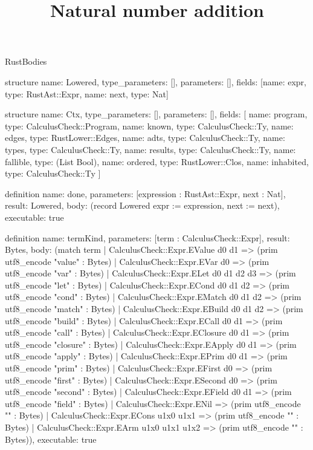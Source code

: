 \begin{lexlean}{RustBodies}
\title{Natural number addition}
\begin{semanticmodule}
structure{
  name: Lowered,
  type_parameters: [],
  parameters: [],
  fields: [{name: expr, type: RustAst::Expr}, {name: next, type: Nat}]
}

structure{
  name: Ctx,
  type_parameters: [],
  parameters: [],
  fields: [
    {name: program, type: CalculusCheck::Program},
    {name: known, type: CalculusCheck::Ty},
    {name: edges, type: RustLower::Edges},
    {name: adts, type: CalculusCheck::Ty},
    {name: types, type: CalculusCheck::Ty},
    {name: results, type: CalculusCheck::Ty},
    {name: fallible, type: (List Bool)},
    {name: ordered, type: RustLower::Clos},
    {name: inhabited, type: CalculusCheck::Ty}
  ]
}

definition{
  name: done,
  parameters: [expression : RustAst::Expr, next : Nat],
  result: Lowered,
  body: (record Lowered {expr := expression, next := next}),
  executable: true
}

definition{
  name: termKind,
  parameters: [term : CalculusCheck::Expr],
  result: Bytes,
  body: (match term
    | CalculusCheck::Expr.EValue d0 d1 => (prim utf8_encode "value" : Bytes)
    | CalculusCheck::Expr.EVar d0 => (prim utf8_encode "var" : Bytes)
    | CalculusCheck::Expr.ELet d0 d1 d2 d3 => (prim utf8_encode "let" : Bytes)
    | CalculusCheck::Expr.ECond d0 d1 d2 => (prim utf8_encode "cond" : Bytes)
    | CalculusCheck::Expr.EMatch d0 d1 d2 => (prim utf8_encode "match" : Bytes)
    | CalculusCheck::Expr.EBuild d0 d1 d2 => (prim utf8_encode "build" : Bytes)
    | CalculusCheck::Expr.ECall d0 d1 => (prim utf8_encode "call" : Bytes)
    | CalculusCheck::Expr.EClosure d0 d1 => (prim utf8_encode "closure" : Bytes)
    | CalculusCheck::Expr.EApply d0 d1 => (prim utf8_encode "apply" : Bytes)
    | CalculusCheck::Expr.EPrim d0 d1 => (prim utf8_encode "prim" : Bytes)
    | CalculusCheck::Expr.EFirst d0 => (prim utf8_encode "first" : Bytes)
    | CalculusCheck::Expr.ESecond d0 => (prim utf8_encode "second" : Bytes)
    | CalculusCheck::Expr.EField d0 d1 => (prim utf8_encode "field" : Bytes)
    | CalculusCheck::Expr.ENil => (prim utf8_encode "" : Bytes)
    | CalculusCheck::Expr.ECons u1x0 u1x1 => (prim utf8_encode "" : Bytes)
    | CalculusCheck::Expr.EArm u1x0 u1x1 u1x2 => (prim utf8_encode "" : Bytes)),
  executable: true
}


\end{semanticmodule}
\end{lexlean}
